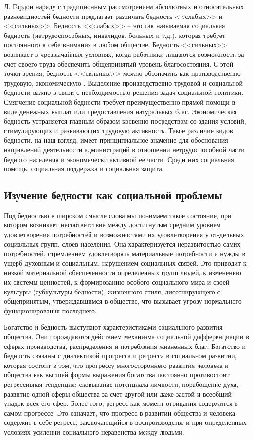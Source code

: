 Л. Гордон наряду с традиционным рассмотрением абсолютных и относительных 
разновидностей бедности предлагает различать бедность <<слабых>> и <<сильных>>. 
Бедность <<слабых>> -- это так называемая социальная бедность 
(нетрудоспособных, инвалидов, больных и т.д.), которая требует постоянного к 
себе внимания в любом обществе. Бедность <<сильных>> возникает в чрезвычайных 
условиях, когда работники лишаются возможности за счет своего труда обеспечить 
общепринятый уровень благосостояния. С этой точки зрения, бедность 
<<сильных>> можно обозначить как производственно-трудовую, экономическую 
\cite{volch_s2}. Выделение производственно-трудовой и социальной бедности важно 
в связи с необходимостью решения задач социальной политики. Смягчение 
социальной бедности требует преимущественно прямой помощи в виде денежных 
выплат или предоставления натуральных благ. Экономическая бедность устраняется 
главным образом косвенно посредством со-здания условий, стимулирующих и 
развивающих трудовую активность. Такое различие видов бедности, на наш взгляд, 
имеет принципиальное значение для обоснования направлений деятельности 
администраций в отношении нетрудоспособной части бедного населения и 
экономически активной ее части. Среди них социальная помощь, социальная 
поддержка и социальная защита.

\subsection{Изучение бедности как социальной проблемы}
Под бедностью в широком смысле слова мы понимаем такое состояние, при котором 
возникает несоответствие между достигнутым средним уровнем удовлетворения 
потребностей и возможностями их удовлетворения у от-дельных социальных 
групп, слоев населения. Она характеризуется неразвитостью самих потребностей, 
стремлением удовлетворять материальные потребности и нужды в ущерб духовным и 
социальным, нарушением социальных связей. Это приводит к низкой материальной 
обеспеченности определенных групп людей, к изменению их системы ценностей, к 
формированию особого социального мира и своей культуры (субкультуры бедности), 
жизненного стиля, диссонирующего с общепринятым, утверждавшимся в обществе, 
что вызывает угрозу нормального функционирования последнего.

Богатство и бедность выступают характеристиками социального развития общества. 
Они порождаются действием механизма социальной дифференциации в сферах 
производства, распределения и потребления жизненных благ. Богатство и бедность 
связаны с диалектикой прогресса и регресса в социальном развитии, которая 
состоит в том, что прогрессу многостороннего развития человека и общества 
как высшей формы выражения богатства постоянно противостоит регрессивная 
тенденция: сковывание потенциала личности, порабощение духа, развитие одной 
сферы общества за счет другой или даже застой и всеобщий упадок всех его 
сфер. Более того, регресс как момент отрицания содержится в самом прогрессе. 
Это означает, что прогресс в развитии общества и человека содержит в себе 
регресс, заключающийся в воспроизводстве и при определенных условиях усилении 
социального неравенства между людьми.

